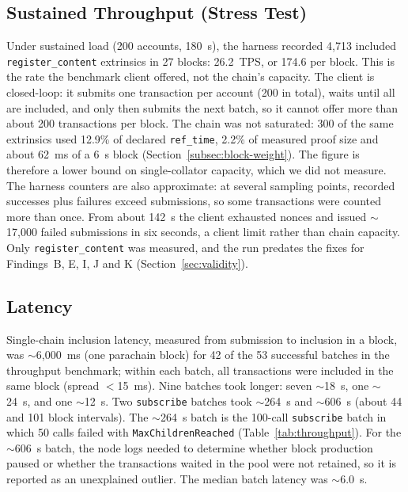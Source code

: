\subsection{Sustained Throughput (Stress Test)}\label{subsec:stress-test}

Under sustained load (200 accounts, 180~s), the harness recorded 4,713 included \texttt{register\_content} extrinsics in 27 blocks: 26.2~TPS, or 174.6 per block. This is the rate the benchmark client offered, not the chain's capacity. The client is closed-loop: it submits one transaction per account (200 in total), waits until all are included, and only then submits the next batch, so it cannot offer more than about 200 transactions per block. The chain was not saturated: 300 of the same extrinsics used 12.9\% of declared \texttt{ref\_time}, 2.2\% of measured proof size and about 62~ms of a 6~s block (Section~\ref{subsec:block-weight}). The figure is therefore a lower bound on single-collator capacity, which we did not measure. The harness counters are also approximate: at several sampling points, recorded successes plus failures exceed submissions, so some transactions were counted more than once. From about 142~s the client exhausted nonces and issued $\sim$17,000 failed submissions in six seconds, a client limit rather than chain capacity. Only \texttt{register\_content} was measured, and the run predates the fixes for Findings~B, E, I, J and K (Section~\ref{sec:validity}).

\subsection{Latency}\label{subsec:latency}

Single-chain inclusion latency, measured from submission to inclusion in a block, was $\sim$6,000~ms (one parachain block) for 42 of the 53 successful batches in the throughput benchmark; within each batch, all transactions were included in the same block (spread $<$15~ms). Nine batches took longer: seven $\sim$18~s, one $\sim$24~s, and one $\sim$12~s. Two \texttt{subscribe} batches took $\sim$264~s and $\sim$606~s (about 44 and 101 block intervals). The $\sim$264~s batch is the 100-call \texttt{subscribe} batch in which 50 calls failed with \texttt{MaxChildrenReached} (Table~\ref{tab:throughput}). For the $\sim$606~s batch, the node logs needed to determine whether block production paused or whether the transactions waited in the pool were not retained, so it is reported as an unexplained outlier. The median batch latency was $\sim$6.0~s.

